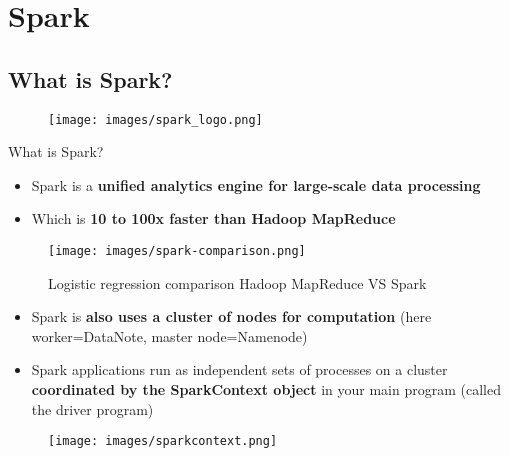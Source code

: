 \documentclass{beamer}[10pt, usepdftitle=false handout]
\begin{document}
\section{Spark}
\subsection{What is Spark?}

\begin{frame}

	\begin{figure}
	\texttt{[image: images/spark\_logo.png]} 
	\end{figure}	

What is Spark?
\vspace*{0.6em}

\begin{itemize}
\item{Spark is a \textbf{unified analytics engine for large-scale data processing}}
\item{Which is \textbf{10 to 100x faster than Hadoop MapReduce}}
\end{itemize}

\begin{figure}
	\texttt{[image: images/spark-comparison.png]} 
	\caption{Logistic regression comparison Hadoop MapReduce VS Spark}
\end{figure}	





\end{frame}

\begin{frame}

\begin{itemize}
	\item{Spark is \textbf{also uses a cluster of nodes for computation} (here worker=DataNote, master node=Namenode)}
	\item{Spark applications run as independent sets of processes on a cluster \textbf{coordinated by the SparkContext object} in your main program (called the driver program)}
\end{itemize}

\begin{figure}
	\texttt{[image: images/sparkcontext.png]} 
\end{figure}	
	
\end{frame}
\end{document}
